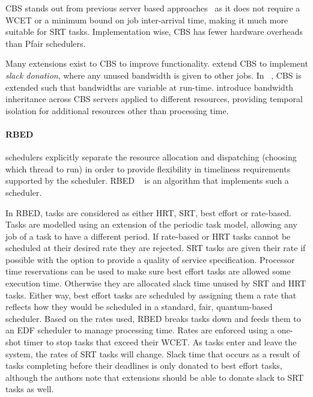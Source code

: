\gls{CBS} stands out from previous server based approaches~\citep{Spuri_Buttazzo_96, Ghazalie_B_95, Spuri_Buttazzo_94, Deng_Liu_97} as it does not require a \gls{WCET} or a minimum bound on job inter-arrival time, making it much more suitable for \gls{SRT} tasks.
Implementation wise, \gls{CBS} has fewer hardware overheads than Pfair schedulers.

Many extensions exist to \gls{CBS} to improve functionality.
\citet{Kato_IR_11} extend \gls{CBS} to implement \emph{slack donation}, where any unused bandwidth is given to other jobs.
In ~\citep{Craciunas_KPRS_12}, \gls{CBS} is extended such that bandwidths are variable at run-time.
\citet{Lamastra_LA_01} introduce bandwidth inheritance across CBS servers applied to different resources, providing temporal isolation for additional resources other than processing time.

\paragraph{\gls{RBED}} schedulers explicitly separate the resource allocation and dispatching (choosing which thread to run) in order to provide flexibility in timeliness requirements supported by the scheduler.
  \Gls{RBED} ~\citep{Brandt_BLB_03} is an algorithm that implements such a scheduler.

In \gls{RBED}, tasks are considered as either \gls{HRT}, \gls{SRT}, best effort or rate-based.
Tasks are modelled using an extension of the periodic task model, allowing any job of a task to have a different period.
If rate-based or \gls{HRT} tasks cannot be scheduled at their desired rate they are rejected.
\gls{SRT} tasks are given their rate if possible with the option to provide a quality of service specification.
Processor time reservations can be used to make sure best effort tasks are allowed some execution time.
Otherwise they are allocated slack time unused by SRT and HRT tasks.
Either way, best effort tasks are scheduled by assigning them a rate that reflects how they would be scheduled in a standard, fair, quantum-based scheduler.
Based on the rates used, \gls{RBED} breaks tasks down and feeds them to an \gls{EDF} scheduler to manage processing time.
Rates are enforced using a one-shot timer to stop tasks that exceed their {\gls{WCET}}.
As tasks enter and leave the system, the rates of \gls{SRT} tasks will change.
Slack time that occurs as a result of tasks completing before their deadlines is only donated to best effort tasks, although the authors note that extensions should be able to donate slack to \gls{SRT} tasks as well.

